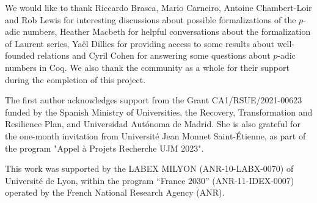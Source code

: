 \documentclass[sigplan,screen]{acmart}
\begin{document}
\begin{acks}
We would like to thank Riccardo Brasca, Mario Carneiro, Antoine Chambert-Loir and Rob Lewis for interesting discussions about possible formalizations of the $p$-adic numbers, Heather Macbeth for helpful conversations about the formalization of Laurent series, Yaël Dillies for providing access to some results about well-founded relations and Cyril Cohen for answering some questions about $p$-adic numbers in Coq. We also thank the \mathlib community as a whole for their support during the completion of this project.

The first author acknowledges support from the Grant CA1/RSUE/2021-00623 funded by the Spanish Ministry of Universities, the Recovery, Transformation and Resilience Plan, and Universidad Autónoma de Madrid. She is also grateful for the one-month invitation from Université Jean Monnet Saint-Étienne, as part of the
program "Appel à Projets Recherche UJM 2023".

This work was supported by the LABEX MILYON (ANR-10-LABX-0070) of Université de Lyon, within the program ``France 2030'' (ANR-11-IDEX-0007) operated by the French National Research Agency (ANR).
\end{acks}
\balance





\end{document}
